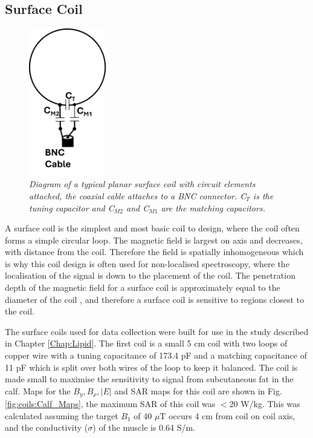 \subsection{Surface Coil}

\begin{figure}[H]
    \centering
    \includegraphics[width=0.3\textwidth]{Figures/Coils/Surface_Coil.png}
    \caption{\textit{Diagram of a typical planar surface coil with circuit elements attached, the coaxial cable attaches to a BNC connector. C$_T$ is the tuning capacitor and C$_{M2}$ and C$_{M1}$ are the matching capacitors.}}
    \label{fig:coils:Surface}
\end{figure}

A surface coil is the simplest and most basic coil to design, where the coil often forms a simple circular loop. The magnetic field is largest on axis and decreases, with distance from the coil. Therefore the field is spatially inhomogeneous which is why this coil design is often used for non-localised spectroscopy, where the localisation of the signal is down to the placement of the coil. The penetration depth of the magnetic field for a surface coil is approximately equal to the diameter of the coil \cite{Gruber2018RFNonphysicists}, and therefore a surface coil is sensitive to regions closest to the coil. 

The surface coils used for data collection were built for use in the study described in Chapter \ref{Chap:Lipid}. The first coil is a small 5 cm coil with two loops of copper wire with a tuning capacitance of 173.4 pF and a matching capacitance of 11 pF which is split over both wires of the loop to keep it balanced. The coil is made small to maximise the sensitivity to signal from subcutaneous fat in the calf. Maps for the $B_y, B_\rho, |E|$ and \ac{SAR} maps for this coil are shown in Fig. \ref{fig:coils:Calf_Maps}, the maximum \ac{SAR} of this coil was $<$20 W/kg. This was calculated assuming the target $B_1$ of 40 $\mu$T occurs 4 cm from coil on coil axis, and the conductivity ($\sigma$) of the muscle is 0.64 S/m.


